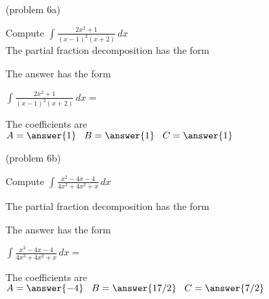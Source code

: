 \documentclass[handout]{ximera}
\begin{document}
\begin{problem}(problem 6a)

Compute $\displaystyle{\int \frac{2x^2 + 1}{(x-1)^2(x+2)}\, dx}$\\

The partial fraction decomposition has the form

\begin{multipleChoice}
\end{multipleChoice}

The answer has the form

$\displaystyle{\int \frac{2x^2 + 1}{(x-1)^2(x+2)} \, dx =}$

\begin{multipleChoice}
\end{multipleChoice}

The coefficients are\\
$A = \answer{1} \;\;\; B = \answer{1} \;\;\; C = \answer{1}$

\end{problem}




\begin{problem}(problem 6b)

Compute $\displaystyle{\int \frac{x^2 - 4x - 4}{4x^3 + 4x^2 + x} \, dx}$

The partial fraction decomposition has the form

\begin{multipleChoice}
\end{multipleChoice}



The answer has the form

$\displaystyle{\int \frac{x^2 - 4x - 4}{4x^3 + 4x^2 + x} \, dx =}$
\begin{multipleChoice}
\end{multipleChoice}

The coefficients are\\
$A = \answer{-4} \;\;\; B = \answer{17/2} \;\;\; C = \answer{7/2}$

\end{problem}
\end{document}
